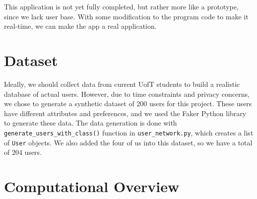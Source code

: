 \documentclass[fontsize=11pt]{article}
\begin{document}
This application is not yet fully completed, but rather more like a prototype, since we lack user base. 
With some modification to the program code to make it real-time, we can make the app a real application. 

\section*{Dataset}
Ideally, we should collect data from current UofT students to build a realistic database of actual users.
However, due to time constraints and privacy concerns, we chose to generate a synthetic dataset of 200 users for this project.
These users have different attributes and preferences, and we used the Faker Python library to generate these data.
The data generation is done with \texttt{generate\_users\_with\_class()} function in \texttt{user\_network.py}, which creates a list of \texttt{User} objects.
We also added the four of us into this dataset, so we have a total of 204 users.

\section*{Computational Overview}
\\
\\
\end{document}
